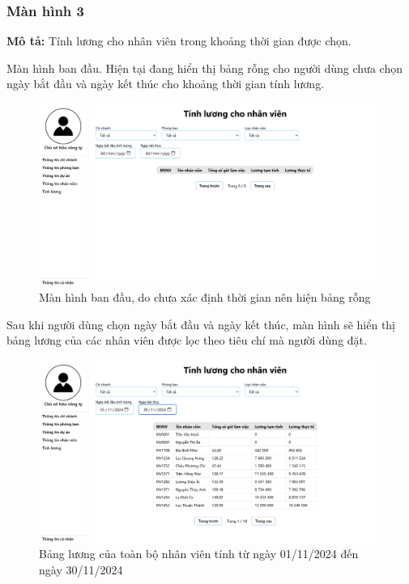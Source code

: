 \subsubsection{Màn hình 3}
\textbf{Mô tả:} Tính lương cho nhân viên trong khoảng thời gian được chọn.

Màn hình ban đầu. Hiện tại đang hiển thị bảng rỗng cho người dùng chưa chọn ngày bắt đầu và ngày kết thúc cho khoảng thời gian tính lương.
\begin{figure}[H]
    \centering
    \includegraphics[width=1\linewidth]{content/images/ManHinh_3_a.png}
    \caption{Màn hình ban đầu, do chưa xác định thời gian nên hiện bảng rỗng}
    \label{fig:ManHinh_3_a}
\end{figure}

Sau khi người dùng chọn ngày bắt đầu và ngày kết thúc, màn hình sẽ hiển thị bảng lương của các nhân viên được lọc theo tiêu chí mà người dùng đặt.
\begin{figure}[H]
    \centering
    \includegraphics[width=1\linewidth]{content/images/ManHinh_3_b.png}
    \caption{Bảng lương của toàn bộ nhân viên tính từ ngày 01/11/2024 đến ngày 30/11/2024}
    \label{fig:ManHinh_3_b}
\end{figure}

